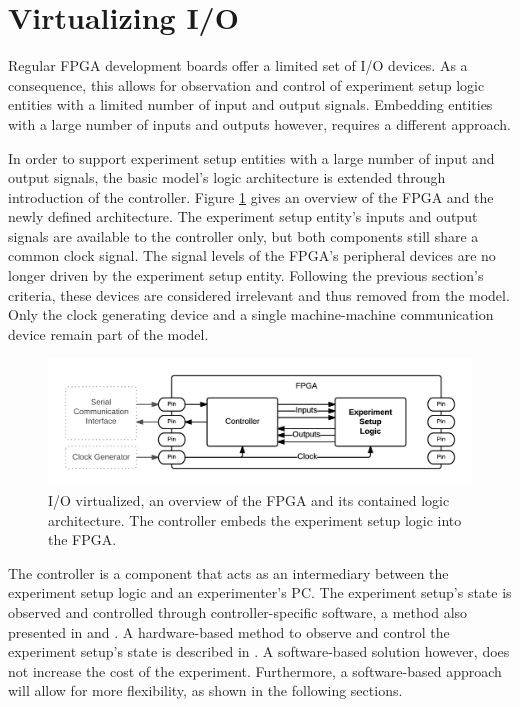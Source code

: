 \documentclass[openright]{uva-bachelor-thesis}
\begin{document}
\section{Virtualizing I/O}
\label{sectionvirtualizingio}
Regular FPGA development boards offer a limited set of I/O devices. As a consequence, this allows for observation and control of experiment setup logic entities with a limited number of input and output signals. Embedding entities with a large number of inputs and outputs however, requires a different approach. 

In order to support experiment setup entities with a large number of input and output signals, the basic model's logic architecture is extended through introduction of the controller. Figure \ref{fig:fpga-inout} gives an overview of the FPGA and the newly defined architecture. The experiment setup entity's inputs and output signals are available to the controller only, but both components still share a common clock signal. The signal levels of the FPGA's peripheral devices are no longer driven by the experiment setup entity. Following the previous section's criteria, these devices are considered irrelevant and thus removed from the model. Only the clock generating device and a single machine-machine communication device remain part of the model. 


\begin{figure}[h]
\centering
\includegraphics[width=\textwidth]{fpga-inout}
\caption{I/O virtualized, an overview of the FPGA and its contained logic architecture. The controller embeds the experiment setup logic into the FPGA.}
\label{fig:fpga-inout}
\end{figure}

The controller is a component that acts as an intermediary between the experiment setup logic and an experimenter's PC. The experiment setup's state is observed and controlled through controller-specific software, a method also presented in \cite{holland2003harnessing} and \cite{bulic2013fpga}. A hardware-based method to observe and control the experiment setup's state is described in \cite{al2007teaching}. A software-based solution however, does not increase the cost of the experiment. Furthermore, a software-based approach will allow for more flexibility, as shown in the following sections. 
\end{document}
